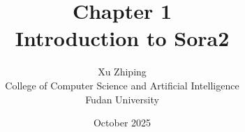 \documentclass[11pt,letterpaper]{book}
\begin{document}
\title{Chapter 1\\
\large Introduction to Sora2}
\author{Xu Zhiping\\
\small College of Computer Science and Artificial Intelligence\\
\small Fudan University}
\date{October 2025}
\maketitle

\tableofcontents

\setcounter{chapter}{0}




\printindex
\end{document}

